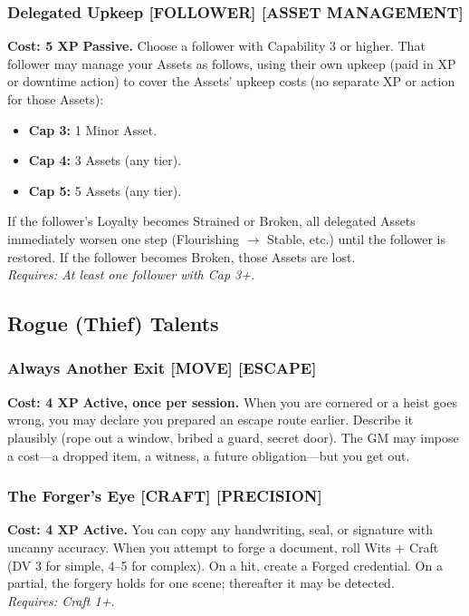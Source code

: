 \documentclass[12pt,a4paper]{book}
\begin{document}
\subsubsection*{Delegated Upkeep \textnormal{[FOLLOWER] [ASSET MANAGEMENT]}}
\label{talent:delegated-upkeep}
\textbf{Cost: 5 XP} \textbf{Passive.} Choose a follower with Capability 3 or higher. That follower may manage your Assets as follows, using their own upkeep (paid in XP or downtime action) to cover the Assets' upkeep costs (no separate XP or action for those Assets):
\begin{itemize}
\item \textbf{Cap 3:} 1 Minor Asset.
\item \textbf{Cap 4:} 3 Assets (any tier).
\item \textbf{Cap 5:} 5 Assets (any tier).
\end{itemize}
If the follower's Loyalty becomes Strained or Broken, all delegated Assets immediately worsen one step (Flourishing $\rightarrow$ Stable, etc.) until the follower is restored. If the follower becomes Broken, those Assets are lost. \\
\textit{Requires: At least one follower with Cap 3+.}

\subsection*{Rogue (Thief) Talents}
\label{sec:major-rogue}

\subsubsection*{Always Another Exit \textnormal{[MOVE] [ESCAPE]}}
\label{talent:always-another-exit}
\textbf{Cost: 4 XP} \textbf{Active, once per session.} When you are cornered or a heist goes wrong, you may declare you prepared an escape route earlier. Describe it plausibly (rope out a window, bribed a guard, secret door). The GM may impose a cost---a dropped item, a witness, a future obligation---but you get out.

\subsubsection*{The Forger's Eye \textnormal{[CRAFT] [PRECISION]}}
\label{talent:forgers-eye}
\textbf{Cost: 4 XP} \textbf{Active.} You can copy any handwriting, seal, or signature with uncanny accuracy. When you attempt to forge a document, roll Wits + Craft (DV 3 for simple, 4--5 for complex). On a hit, create a Forged credential. On a partial, the forgery holds for one scene; thereafter it may be detected. \\
\textit{Requires: Craft 1+.}
\end{document}
